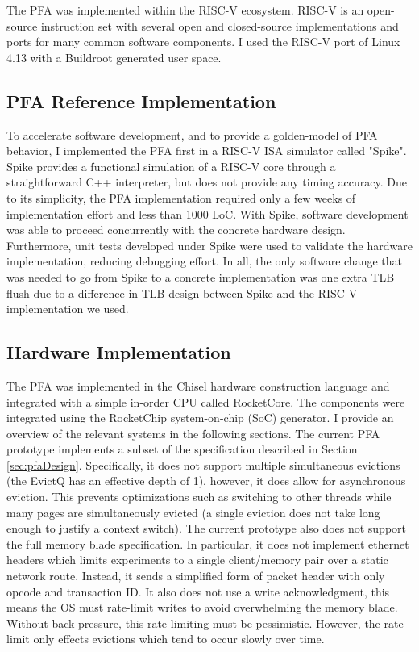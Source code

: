 The PFA was implemented within the RISC-V ecosystem. RISC-V is an open-source
instruction set with several open and closed-source implementations and ports
for many common software components\cite{riscv}. I used the RISC-V port of
Linux 4.13 with a Buildroot generated user
space.

\subsection{PFA Reference Implementation}
To accelerate software development, and to provide a golden-model of
PFA behavior, I implemented the PFA first in a RISC-V ISA simulator called
"Spike"\cite{spike}. Spike provides a functional simulation of a RISC-V core
through a straightforward C++ interpreter, but does not provide any timing
accuracy. Due to its simplicity, the PFA implementation required only a few
weeks of implementation effort and less than 1000 LoC. With Spike, software
development was able to proceed concurrently with the concrete hardware design.
Furthermore, unit tests developed under Spike were used to validate the
hardware implementation, reducing debugging effort. In all, the only software
change that was needed to go from Spike to a concrete implementation was one
extra TLB flush due to a difference in TLB design between Spike and the RISC-V
implementation we used.

\subsection{Hardware Implementation}
The PFA was implemented in the Chisel hardware construction
language\cite{chisel} and integrated with a simple in-order CPU called
RocketCore\cite{rocketchip}. The components were integrated using the
RocketChip system-on-chip (SoC) generator\cite{rocketchip}. I provide an
overview of the relevant systems in the following sections. The current PFA
prototype implements a subset of the specification described in Section
\ref{sec:pfaDesign}. Specifically, it does not support multiple simultaneous
evictions (the EvictQ has an effective depth of 1), however, it does allow for
asynchronous eviction. This prevents optimizations such as switching to other
threads while many pages are simultaneously evicted (a single eviction does not
take long enough to justify a context switch). The current prototype also does
not support the full memory blade specification. In particular, it does not
implement ethernet headers which limits experiments to a single client/memory
pair over a static network route. Instead, it sends a simplified form of packet
header with only opcode and transaction ID. It also does not use a write
acknowledgment, this means the OS must rate-limit writes to avoid overwhelming
the memory blade. Without back-pressure, this rate-limiting must be
pessimistic.  However, the rate-limit only effects evictions which tend to
occur slowly over time.
 
